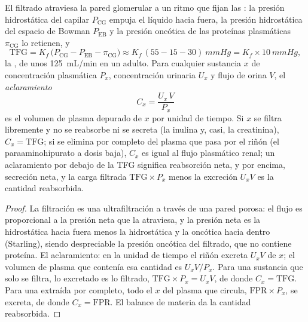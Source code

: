 \begin{theorem}\label{thm:b3:renal-osmoregulation:clearance}
El filtrado atraviesa la pared glomerular a un ritmo que fijan las
\emph{}: la presión hidrostática del capilar
$P_{\text{CG}}$ empuja el líquido hacia fuera, la presión hidrostática
del espacio de Bowman $P_{\text{EB}}$ y la presión oncótica de las
proteínas plasmáticas $\pi_{\text{CG}}$ lo retienen, y
\[
\text{TFG} = K_{f}\,\bigl(P_{\text{CG}} - P_{\text{EB}} - \pi_{\text{CG}}\bigr)
\approx K_{f}\,(55 - 15 - 30)\ \unit{mmHg} = K_{f}\times \qty{10}{mmHg},
\]
la \emph{}, de unos \qty{125}{mL/min} en
un adulto. Para cualquier sustancia $x$ de concentración plasmática
$P_{x}$, concentración urinaria $U_{x}$ y flujo de orina $V$, el
\emph{aclaramiento}
\[
C_{x} = \frac{U_{x}\,V}{P_{x}}
\]
es el volumen de plasma depurado de $x$ por unidad de tiempo. Si $x$ se
filtra libremente y no se reabsorbe ni se secreta (la inulina y, casi,
la creatinina), $C_{x} = \text{TFG}$; si se elimina por completo del
plasma que pasa por el riñón (el paraaminohipurato a dosis baja),
$C_{x}$ es igual al flujo plasmático renal; un aclaramiento por debajo
de la TFG significa reabsorción neta, y por encima, secreción neta, y
la carga filtrada $\text{TFG}
\times P_{x}$ menos la excreción $U_{x}V$ es la cantidad reabsorbida.
\end{theorem}
\begin{proof}
La filtración es una ultrafiltración a través de una pared porosa: el
flujo es proporcional a la presión neta que la atraviesa, y la presión
neta es la hidrostática hacia fuera menos la hidrostática y la oncótica
hacia dentro (Starling), siendo despreciable la presión oncótica del
filtrado, que no contiene proteína. El aclaramiento: en la unidad de
tiempo el riñón excreta $U_{x}V$ de $x$; el volumen de plasma que
contenía esa cantidad es $U_{x}V/P_{x}$. Para una sustancia que solo se
filtra, lo excretado es lo filtrado, $\text{TFG}\times P_{x} = U_{x}V$,
de donde $C_{x} = \text{TFG}$. Para una extraída por completo, todo el
$x$ del plasma que circula, $\text{FPR}\times P_{x}$, se excreta, de
donde $C_{x} = \text{FPR}$. El balance de materia da la cantidad
reabsorbida.
\end{proof}

